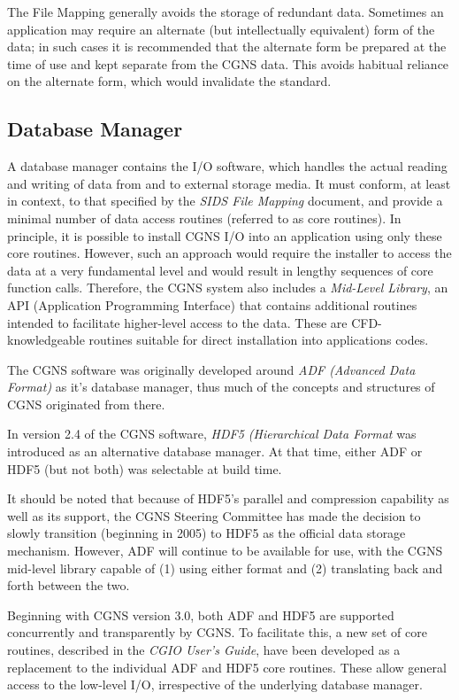 The File Mapping generally avoids the storage of redundant data.
Sometimes an application may require an alternate (but intellectually
equivalent) form of the data; in such cases it is recommended that the
alternate form be prepared at the time of use and kept separate from the
CGNS data.
This avoids habitual reliance on the alternate form, which would
invalidate the standard.

\subsection{Database Manager}

A database manager contains the I/O software,
which handles the actual reading and writing
of data from and to external storage media. It must conform, at least
in context, to that specified by the
\textit{SIDS File Mapping} document,
and provide a minimal number of data access routines
(referred to as core routines).
In principle, it is possible to install CGNS I/O into an application
using only these core routines.
However, such an approach would require the installer to access the data
at a very fundamental level and would result in lengthy sequences of
core function calls.
Therefore, the CGNS system also includes a \textit{Mid-Level Library},
an API (Application Programming Interface) that contains
additional routines intended to facilitate higher-level access to the
data.
These are CFD-knowledgeable routines suitable for direct installation
into applications codes.

The CGNS software was originally developed around
\textit{ADF (Advanced Data Format)}
as it's database manager, thus much of the concepts and structures
of CGNS originated from there.

In version 2.4 of the CGNS software,
\textit{HDF5 (Hierarchical Data Format} was
introduced as an alternative database manager. At that time, either
ADF or HDF5 (but not both) was selectable at build time.

It should be noted that because of HDF5's parallel and compression      
capability as well as its support, the CGNS Steering Committee has made 
the decision to slowly transition (beginning in 2005) to HDF5 as the    
official data storage mechanism.                                        
However, ADF will continue to be available for use, with the CGNS
mid-level library capable of (1) using either format and (2) translating
back and forth between the two.

Beginning with CGNS version 3.0,
both ADF and HDF5 are supported concurrently and transparently
by CGNS. To facilitate this, a new set of core routines, described in
the \textit{CGIO User's Guide}, have been
developed as a replacement to the individual ADF and HDF5 core routines.
These allow general access to the low-level I/O, irrespective of the
underlying database manager.

